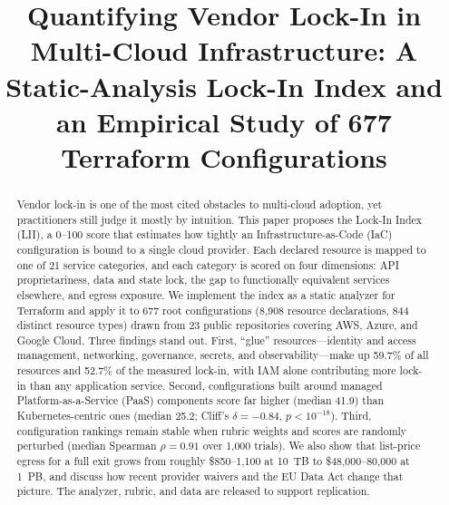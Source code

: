 \documentclass[conference]{IEEEtran}
\begin{document}
\title{Quantifying Vendor Lock-In in Multi-Cloud Infrastructure: A Static-Analysis Lock-In Index and an Empirical Study of 677 Terraform Configurations}

\author{
\and
{}
\and
{}
}

\maketitle

\begin{abstract}
Vendor lock-in is one of the most cited obstacles to multi-cloud adoption, yet practitioners still judge it mostly by intuition. This paper proposes the Lock-In Index (LII), a 0--100 score that estimates how tightly an Infrastructure-as-Code (IaC) configuration is bound to a single cloud provider. Each declared resource is mapped to one of 21 service categories, and each category is scored on four dimensions: API proprietariness, data and state lock, the gap to functionally equivalent services elsewhere, and egress exposure. We implement the index as a static analyzer for Terraform and apply it to 677 root configurations (8{,}908 resource declarations, 844 distinct resource types) drawn from 23 public repositories covering AWS, Azure, and Google Cloud. Three findings stand out. First, ``glue'' resources---identity and access management, networking, governance, secrets, and observability---make up 59.7\% of all resources and 52.7\% of the measured lock-in, with IAM alone contributing more lock-in than any application service. Second, configurations built around managed Platform-as-a-Service (PaaS) components score far higher (median 41.9) than Kubernetes-centric ones (median 25.2; Cliff's $\delta=-0.84$, $p<10^{-18}$). Third, configuration rankings remain stable when rubric weights and scores are randomly perturbed (median Spearman $\rho=0.91$ over 1{,}000 trials). We also show that list-price egress for a full exit grows from roughly \$850--1{,}100 at 10~TB to \$48{,}000--80{,}000 at 1~PB, and discuss how recent provider waivers and the EU Data Act change that picture. The analyzer, rubric, and data are released to support replication.
\end{abstract}
\end{document}
